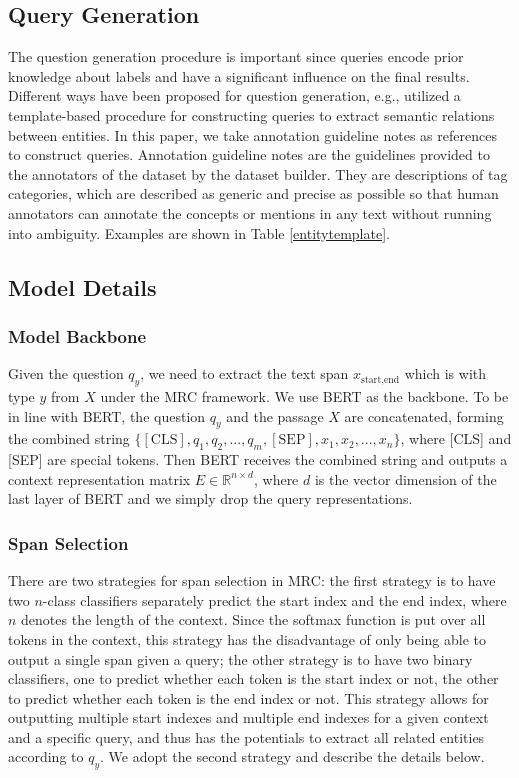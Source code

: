 \documentclass[11pt,a4paper]{article}
\begin{document}
\subsection{Query Generation}
The question generation procedure is important since queries encode prior knowledge about labels and have a significant influence on the final results. 
Different ways have been proposed for question generation, e.g., 
 utilized a template-based procedure for constructing queries to extract semantic relations between entities. 
In this paper, we take annotation guideline notes as references to construct queries. 
Annotation guideline notes are the guidelines provided to the annotators of the dataset 
by the dataset builder. They are  descriptions of tag categories, which are described as generic and precise as possible so that human annotators can annotate the concepts or mentions in any text without running into ambiguity. Examples are shown in Table \ref{entitytemplate}. 


\subsection{Model Details} 
\subsubsection{Model Backbone}
Given the question $q_y$,
we need to extract the text span $x_\text{start,end}$ which is with type $y$  from $X$ under the MRC framework.  
We use BERT \cite{devlin2018bert} as the backbone. 
To be in line with BERT, the question  $q_y$ and the passage $X$ are concatenated, forming the combined string 
 $\{[\text{CLS}], q_1, q_2, ..., q_m, [\text{SEP}], x_1, x_2, ..., x_n\}$, where [CLS] and [SEP] are special tokens. Then BERT receives the combined string and outputs a context representation matrix $E\in\mathbb{R}^{n\times d}$, where $d$ is the vector dimension of the last layer of BERT and we simply drop the query representations. 
 
\subsubsection{Span Selection} There are  two strategies  for span selection in MRC:
the first strategy \cite{seo2016bidirectional,wang2016multi} is to have two $n$-class classifiers separately predict the  start index and the end index, where $n$ denotes the length of the context.
Since the softmax function is put over all tokens in the context, this strategy has the disadvantage of only being able to output a single span given a query; 
the other strategy is to have two binary classifiers, 
one to predict whether each  token is the start index or not, 
the other to predict whether each token is the end index or not. 
This strategy allows for outputting multiple start indexes and multiple end indexes for a given context and a specific query, and thus has the potentials to extract all related entities according to $q_y$.
We adopt the second strategy and describe the details below.
\end{document}
